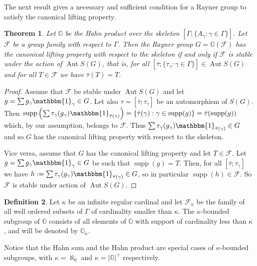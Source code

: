 \documentclass[12pt,a4paper,reqno,openright]{amsart}
\newcommand{\bbG}{{\mathbb G}}
\newcommand{\cF}{{\mathcal F}}
\renewcommand{\1}{\mathbbm{1}}
\DeclareMathOperator{\Aut}{Aut}
\newcommand{\GG}{\bbG}
\DeclareMathOperator*\supp{supp}
\theoremstyle{definition}
\newtheorem{defn}{Definition}[section]
\theoremstyle{plain}
\theoremstyle{plain}
\theoremstyle{plain}
\theoremstyle{plain}
\theoremstyle{plain}
\newtheorem{theorem}[defn]{Theorem}
\theoremstyle{plain}
\theoremstyle{plain}
\theoremstyle{plain}
\theoremstyle{definition}
\theoremstyle{definition}
\theoremstyle{plain}
\theoremstyle{definition}
\theoremstyle{definition}
\theoremstyle{plain}
\theoremstyle{plain}
\theoremstyle{plain}
\begin{document}
The next result gives a necessary and sufficient condition for a Rayner group to satisfy the canonical lifting property.
\begin{theorem}\label{prop:rayner-groups-canonical-stable}
	Let $ \GG $ be the Hahn product over the skeleton $ [\Gamma;\{ A_\gamma:\gamma\in\Gamma \}] $. Let $ \cF $ be a group family with respect to $ \Gamma $. Then the Rayner group $ G = \GG(\cF) $ has the canonical lifting property with respect to the skeleton if and only if $ \cF $ is stable under the action of $ \Aut S(G) $, that is, for all $ [\bar\tau;\{ \tau_\gamma:\gamma\in\Gamma \}]\in\Aut S(G) $ and for all $ T\in\cF $ we have $ \bar\tau(T)=T $.
\end{theorem}
\begin{proof}
	Assume that $ \cF $ be stable under $ \Aut S(G) $ and let $ g = \sum g_\gamma\1_\gamma\in G $. Let also $ \tau=[\bar\tau;\tau_\gamma] $ be an automorphism of $ S(G) $. Then $ \supp\left( \sum\tau_\gamma(g_\gamma)\1_{\bar\tau(\gamma)}\right) = \{ \bar\tau(\gamma):\gamma\in\supp(g) \} = \bar\tau(\supp(g)) $ which, by our assumption, belongs to $ \cF $. Thus $ \sum\tau_\gamma(g_\gamma)\1_{\bar\tau(\gamma)} \in G $ and so $ G $ has the canonical lifting property with respect to the skeleton.
	
	Vice versa, assume that $ G $ has the canonical lifting property and let $ T\in\cF $. Let $ g = \sum g_\gamma\1_\gamma \in G $ be such that $ \supp(g)=T $. Then, for all $ [\bar\tau;\tau_\gamma] $ we have $ h:= \sum\tau_\gamma(g_\gamma)\1_{\bar\tau(\gamma)}\in G $, so in particular
	$ \supp(h) \in \cF $. So $ \cF $ is stable under action of $ \Aut S(G) $.
\end{proof}

\begin{defn}
	Let $ \kappa $ be an infinite regular cardinal and let $ \cF_\kappa $ be the family of all well ordered subsets of $ \Gamma $ of cardinality smaller than $ \kappa $. The $ \kappa $-bounded subgroup of $ \GG $ consists of all elements of $ \GG $	with support of cardinality less than $ \kappa $, and will be denoted by $ \GG_\kappa $.
	
	\noindent Notice that the Hahn sum and the Hahn product are special cases of $ \kappa $-bounded subgroups, with $ \kappa = \aleph_0 $ and $ \kappa = |\GG|^+ $ respectively.
\end{defn}
\end{document}
